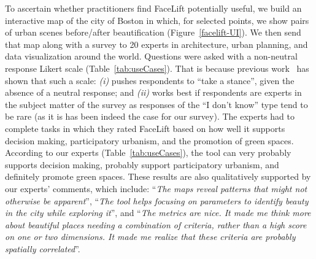 To ascertain whether practitioners find FaceLift potentially useful, we build an interactive map of the city of Boston in which, for  selected points, we show pairs of urban scenes before/after beautification (Figure~\ref{facelift-UI}). We then send that map along with a survey to 20 experts in architecture, urban planning, and data visualization around the world. Questions were asked with a non-neutral response Likert scale (Table~\ref{tab:useCases}). That is because previous work~\cite{Agree2012,moors2008exploring} has shown that such a scale: \emph{(i)} pushes respondents to ``take a stance'', given the absence of a neutral response; and \emph{(ii)} works best if respondents are experts in the subject matter of the survey as responses of the ``I don't know'' type tend to be rare (as it is has been indeed the case for our survey). The experts had to complete tasks in which they rated FaceLift based on how well it supports decision making, participatory urbanism, and the promotion of green spaces. According to our experts (Table~\ref{tab:useCases}), the tool can very probably supports decision making, probably support participatory urbanism, and definitely promote green spaces.  These results are  also qualitatively supported by our experts' comments, which include: ``\textit{The maps reveal patterns that might not otherwise be apparent}'',  ``\textit{The tool helps focusing on parameters to identify beauty in the city while exploring it}'',  and ``\textit{The metrics are nice. It made me think more about beautiful places needing a combination of criteria, rather than a high score on one or two dimensions. It made me realize that these criteria are probably spatially correlated}''.







